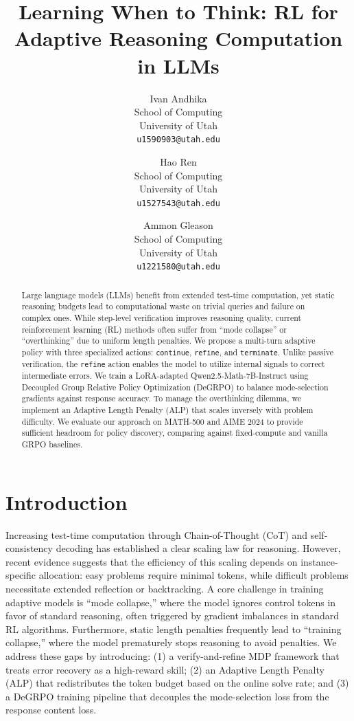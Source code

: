 \documentclass{article}
\title{Learning When to Think: RL for Adaptive Reasoning Computation in LLMs}
\author{%
  Ivan Andhika \\
  School of Computing\\
  University of Utah\\
  \texttt{u1590903@utah.edu}
  \and
  Hao Ren \\
  School of Computing\\
  University of Utah\\
  \texttt{u1527543@utah.edu}
  \and
  Ammon Gleason \\
  School of Computing\\
  University of Utah\\
  \texttt{u1221580@utah.edu}
}
\begin{document}
\maketitle

\begin{abstract}
Large language models (LLMs) benefit from extended test-time computation, yet static reasoning budgets lead to computational waste on trivial queries and failure on complex ones.
While step-level verification improves reasoning quality, current reinforcement learning (RL) methods often suffer from ``mode collapse'' or ``overthinking'' due to uniform length penalties.
We propose a multi-turn adaptive policy with three specialized actions: \texttt{continue}, \texttt{refine}, and \texttt{terminate}.
Unlike passive verification, the \texttt{refine} action enables the model to utilize internal signals to correct intermediate errors.
We train a LoRA-adapted Qwen2.5-Math-7B-Instruct using Decoupled Group Relative Policy Optimization (DeGRPO) to balance mode-selection gradients against response accuracy.
To manage the overthinking dilemma, we implement an Adaptive Length Penalty (ALP) that scales inversely with problem difficulty.
We evaluate our approach on MATH-500 and AIME 2024 to provide sufficient headroom for policy discovery, comparing against fixed-compute and vanilla GRPO baselines.
\end{abstract}

\section{Introduction}

Increasing test-time computation through Chain-of-Thought (CoT) and self-consistency decoding has established a clear scaling law for reasoning.
However, recent evidence suggests that the efficiency of this scaling depends on instance-specific allocation: easy problems require minimal tokens, while difficult problems necessitate extended reflection or backtracking.
A core challenge in training adaptive models is ``mode collapse,'' where the model ignores control tokens in favor of standard reasoning, often triggered by gradient imbalances in standard RL algorithms.
Furthermore, static length penalties frequently lead to ``training collapse,'' where the model prematurely stops reasoning to avoid penalties.
We address these gaps by introducing: (1) a verify-and-refine MDP framework that treats error recovery as a high-reward skill; (2) an Adaptive Length Penalty (ALP) that redistributes the token budget based on the online solve rate; and (3) a DeGRPO training pipeline that decouples the mode-selection loss from the response content loss.
\end{document}
